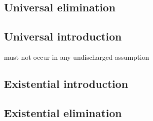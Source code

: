 \begin{multicols}{2}
\subsection*{Universal elimination}

\begin{fitchproof}
	 
\end{fitchproof}

\subsection*{Universal introduction}

\begin{fitchproof}
	 
\end{fitchproof}

\medskip\begin{raggedright}
 must not occur in any undischarged assumption

\end{raggedright}

\subsection*{Existential introduction}

\begin{fitchproof}
\end{fitchproof}


\subsection*{Existential elimination}


\end{multicols}
